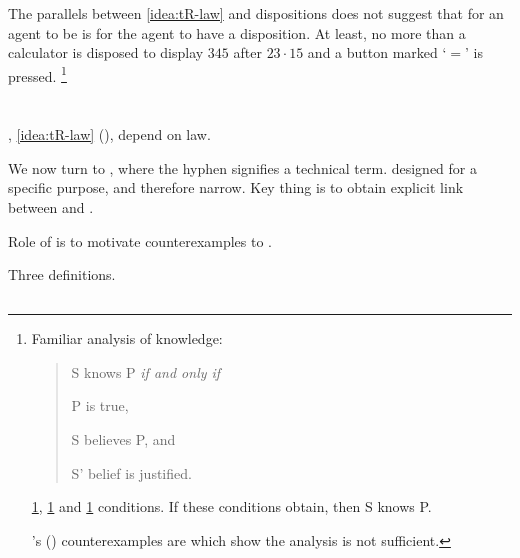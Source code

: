 \begin{note}
  The parallels between \autoref{idea:tR-law} and dispositions does not suggest that for an agent to be \dtC{} is for the agent to have a disposition.
  At least, no more than a calculator is disposed to display \(345\) after \(23 \cdot 15\) and a button marked `\(=\)' is pressed.%
  \footnote{
    Familiar analysis of knowledge:

    \begin{quote}
      S knows P \emph{if and only if}
      \begin{enumerate*}[label=\roman*., ref=(\roman*)]
      \item
        \label{K:jtb:t}
        P is true,
      \item
        \label{K:jtb:b}
        S believes P, and
      \item
        \label{K:jtb:j}
        S' belief is justified.
      \end{enumerate*}%
    \end{quote}

    \ref{K:jtb:t}, \ref{K:jtb:b} and \ref{K:jtb:j} conditions.
    If these conditions obtain, then S knows P.

    \citeauthor{Gettier:1963aa}'s (\citeyear{Gettier:1963aa}) counterexamples are  which show the analysis is not sufficient.
  }
\end{note}


\section{}
\label{cha:typical:tCDef}

\begin{note}
  \dtC{}, \autoref{idea:tR-law} (), depend on law.

  We now turn to \tC{}, where the hyphen signifies a technical term.
  \tC{} designed for a specific purpose, and therefore narrow.
  Key thing is to obtain explicit link between \tC{} and .

  Role of \tC{} is to motivate counterexamples to \issueConstraint{}.

  Three definitions.
\end{note}

\subsection{}
\label{cha:typical:tCDef:ToRdef}

